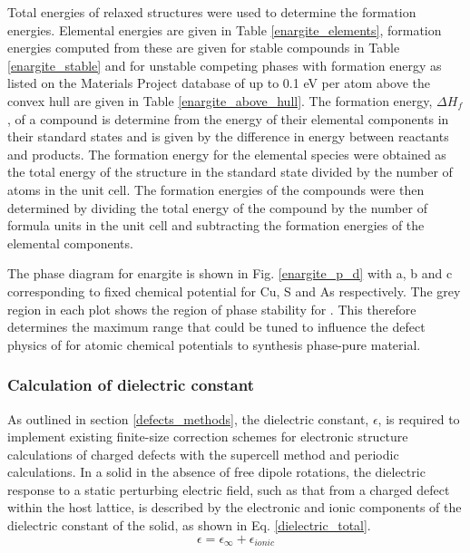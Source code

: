 \documentclass[11pt, twoside]{report}
\begin{document}
Total energies of relaxed structures were used to determine the formation energies. Elemental energies are given in Table \ref{enargite_elements}, formation energies computed from these are given for stable compounds in Table \ref{enargite_stable} and for unstable competing phases with formation energy as listed on the Materials Project database of up to 0.1 eV per atom above the convex hull are given in Table \ref{enargite_above_hull}.
The formation energy, $\Delta H_f$, of a compound is determine from the energy of their elemental components in their standard states and is given by the difference in energy between reactants and products.
The formation energy for the elemental species were obtained as the total energy of the structure in the standard state divided by the number of atoms in the unit cell. The formation energies of the compounds were then determined by dividing the total energy of the compound by the number of formula units in the unit cell and subtracting the formation energies of the elemental components.

The phase diagram for enargite is shown in Fig. \ref{enargite_p_d} with a, b and c corresponding to fixed chemical potential for Cu, S and As respectively. The grey region in each plot shows the region of phase stability for {\enargite}. This therefore determines the maximum range that could be tuned to influence the defect physics of {\enargite} for atomic chemical potentials to synthesis phase-pure material.




\subsubsection{Calculation of dielectric constant}

As outlined in section \ref{defects_methods}, the dielectric constant, $\epsilon$, is required to implement existing finite-size correction schemes for electronic structure calculations of charged defects with the supercell method and periodic calculations. 
In a solid in the absence of free dipole rotations, the dielectric response to a static perturbing electric field, such as that from a charged defect within the host lattice, is described by the electronic and ionic components of the dielectric constant of the solid, as shown in Eq. \ref{dielectric_total}. 
\begin{equation} \label{dielectric_total}
\epsilon = \epsilon_{\infty} + \epsilon_{ionic}
\end{equation}
\end{document}
